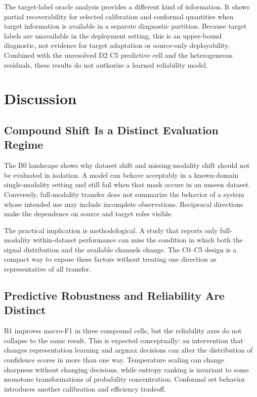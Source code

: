 \documentclass[11pt]{article}
\begin{document}
The target-label oracle analysis provides a different kind of information. It shows partial recoverability for selected calibration and conformal quantities when target information is available in a separate diagnostic partition. Because target labels are unavailable in the deployment setting, this is an upper-bound diagnostic, not evidence for target adaptation or source-only deployability. Combined with the unresolved D2 C5 predictive cell and the heterogeneous residuals, these results do not authorize a learned reliability model.

\section{Discussion}
\subsection{Compound Shift Is a Distinct Evaluation Regime}
The B0 landscape shows why dataset shift and missing-modality shift should not be evaluated in isolation. A model can behave acceptably in a known-domain single-modality setting and still fail when that mask occurs in an unseen dataset. Conversely, full-modality transfer does not summarize the behavior of a system whose intended use may include incomplete observations. Reciprocal directions make the dependence on source and target roles visible.

The practical implication is methodological. A study that reports only full-modality within-dataset performance can miss the condition in which both the signal distribution and the available channels change. The C0--C5 design is a compact way to expose these factors without treating one direction as representative of all transfer.

\subsection{Predictive Robustness and Reliability Are Distinct}
B1 improves macro-F1 in three compound cells, but the reliability axes do not collapse to the same result. This is expected conceptually: an intervention that changes representation learning and argmax decisions can alter the distribution of confidence scores in more than one way. Temperature scaling can change sharpness without changing decisions, while entropy ranking is invariant to some monotone transformations of probability concentration. Conformal set behavior introduces another calibration and efficiency tradeoff.
\end{document}
